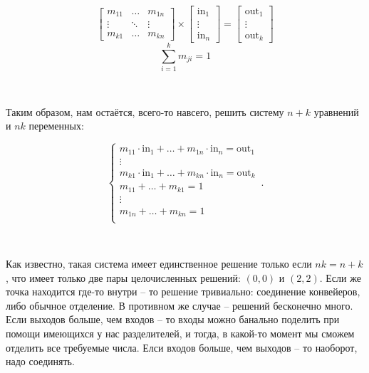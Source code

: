 $$
\left[
\begin{matrix}
	m_{11} & \ldots & m_{1n} \\
	\vdots & \ddots & \vdots \\
	m_{k1} & \ldots & m_{kn}
\end{matrix}
\right]
\times
\left[
\begin{matrix}
	\text{in}_1 \\
	\vdots \\
	\text{in}_n
\end{matrix}
\right]
=
\left[
\begin{matrix}
	\text{out}_1 \\
	\vdots \\
	\text{out}_k
\end{matrix}
\right]
$$
$$
\sum_{i=1}^k m_{ji} = 1
$$


\

\noindent Таким образом, нам остаётся, всего-то навсего, решить систему $n+k$ уравнений и $nk$ переменных:

\begin{equation*}
	\begin{cases}
		m_{11}\cdot \text{in}_1 + \ldots + m_{1n}\cdot \text{in}_n = \text{out}_1 \\
		\vdots \\
		m_{k1}\cdot \text{in}_1 + \ldots + m_{kn}\cdot \text{in}_n = \text{out}_k \\
		m_{11} + \ldots + m_{k1} = 1 \\
		\vdots \\
		m_{1n} + \ldots + m_{kn} = 1 \\
	\end{cases}\,.
\end{equation*}

\

Как известно, такая система имеет единственное решение только если $nk = n+k$, что имеет только две пары целочисленных решений: $(0,0)$ и $(2,2)$. Если же точка находится где-то внутри -- то решение тривиально: соединение конвейеров, либо обычное отделение. В противном же случае -- решений бесконечно много. Если выходов больше, чем входов -- то входы можно банально поделить при помощи имеющихся у нас разделителей, и тогда, в какой-то момент мы сможем отделить все требуемые числа. Елси входов больше, чем выходов -- то наоборот, надо соединять.


























